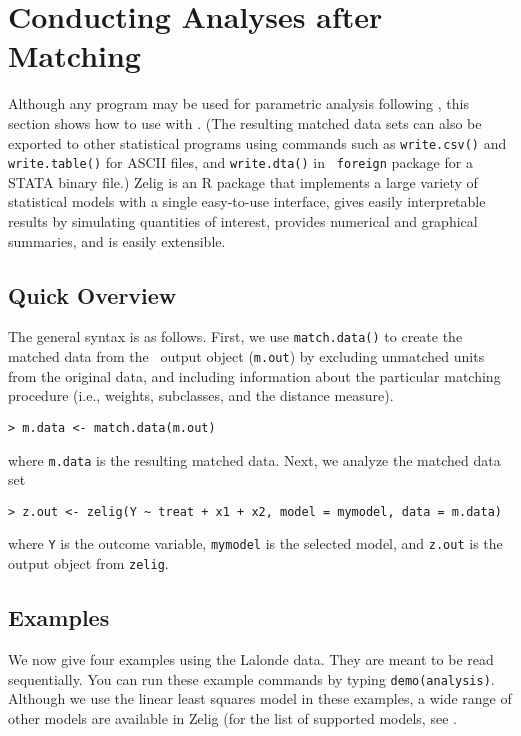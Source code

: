 \section{Conducting Analyses after Matching}
\label{sec:analysis}

Although any program may be used for parametric analysis following
\MatchIt, this section shows how to use
 with \MatchIt.  (The
resulting matched data sets can also be exported to other statistical
programs using commands such as {\tt write.csv()} and {\tt
  write.table()} for ASCII files, and {\tt write.dta()} in {\tt
  foreign} package for a STATA binary file.)  Zelig
\citep{ImaKinLau04} is an R package that implements a large variety of
statistical models with a single easy-to-use interface, gives easily
interpretable results by simulating quantities of interest, provides
numerical and graphical summaries, and is easily extensible.

\subsection{Quick Overview}

The general syntax is as follows. First, we use \texttt{match.data()}
to create the matched data from the \MatchIt\ output object
(\texttt{m.out}) by excluding unmatched units from the original data,
and including information about the particular matching procedure
(i.e., weights, subclasses, and the distance measure).
\begin{verbatim}
> m.data <- match.data(m.out)
\end{verbatim}
where {\tt m.data} is the resulting matched data.  Next, we analyze
the matched data set
\begin{verbatim}
> z.out <- zelig(Y ~ treat + x1 + x2, model = mymodel, data = m.data)
\end{verbatim}
where {\tt Y} is the outcome variable, {\tt mymodel} is the selected
model, and {\tt z.out} is the output object from {\tt zelig}.

\subsection{Examples}

We now give four examples using the Lalonde data.  They are meant to
be read sequentially.  You can run these example commands by typing
{\tt demo(analysis)}.  Although we use the linear least squares model
in these examples, a wide range of other models are available in Zelig
(for the list of supported models, see
.

